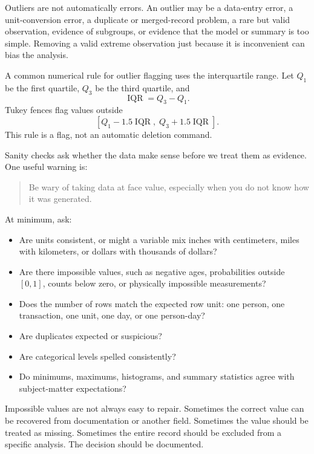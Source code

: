 {Outliers are not automatically errors.  An outlier may be a data-entry error, a unit-conversion error, a duplicate or merged-record problem, a rare but valid observation, evidence of subgroups, or evidence that the model or summary is too simple.  Removing a valid extreme observation just because it is inconvenient can bias the analysis.

A common numerical rule for outlier flagging uses the interquartile range.  Let $Q_1$ be the first quartile, $Q_3$ be the third quartile, and
\begin{equation}
  \operatorname{IQR}=Q_3-Q_1.
\end{equation}
Tukey fences flag values outside
\begin{equation}
  \left[Q_1-1.5\operatorname{IQR},\; Q_3+1.5\operatorname{IQR}\right].
  \label{eq:ch3-tukey-fences}
\end{equation}
This rule is a flag, not an automatic deletion command.

Sanity checks ask whether the data make sense before we treat them as evidence.  One useful warning is:
\begin{quote}
  Be wary of taking data at face value, especially when you do not know how it was generated.
\end{quote}

At minimum, ask:
\begin{itemize}
  \item Are units consistent, or might a variable mix inches with centimeters, miles with kilometers, or dollars with thousands of dollars?
  \item Are there impossible values, such as negative ages, probabilities outside $[0,1]$, counts below zero, or physically impossible measurements?
  \item Does the number of rows match the expected row unit: one person, one transaction, one unit, one day, or one person-day?
  \item Are duplicates expected or suspicious?
  \item Are categorical levels spelled consistently?
  \item Do minimums, maximums, histograms, and summary statistics agree with subject-matter expectations?
\end{itemize}

Impossible values are not always easy to repair.  Sometimes the correct value can be recovered from documentation or another field.  Sometimes the value should be treated as missing.  Sometimes the entire record should be excluded from a specific analysis.  The decision should be documented.

}

